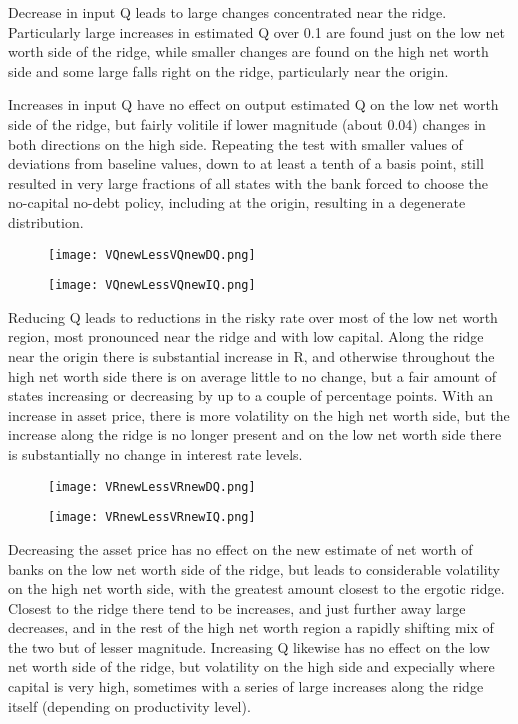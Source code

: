 \documentclass[english]{article}
\begin{document}
Decrease in input Q leads to large changes concentrated near the ridge. Particularly large
increases in estimated Q over 0.1 are found just on the low net worth side of the ridge, while smaller changes
are found on the high net worth side and some large falls right on the ridge, particularly near the origin.

Increases in input Q have no effect on output estimated Q on the low net worth side 
of the ridge, but fairly volitile if lower magnitude (about 0.04) changes in both directions 
on the high side. Repeating the test with smaller values of deviations from baseline values, 
down to at least a tenth of a basis point, still resulted in very large fractions of all states 
with the bank forced to choose the no-capital no-debt policy, including at the origin, resulting in 
a degenerate distribution.




\begin{figure}[H]
\centering
		\texttt{[image: VQnewLessVQnewDQ.png]}
\end{figure}
\begin{figure}[H]
\centering
		\texttt{[image: VQnewLessVQnewIQ.png]}
\end{figure}


Reducing Q leads to reductions in the risky rate over most of the low net worth region, most pronounced
near the ridge and with low capital. Along the ridge near the origin there is substantial increase in R, and 
otherwise throughout the high net worth side there is on average little to no change, but a fair amount of 
states increasing or decreasing by up to a couple of percentage points. With an increase in asset price, 
there is more volatility on the high net worth side, but the increase along the ridge is no longer present and 
on the low net worth side there is substantially no change in interest rate levels.



\begin{figure}[H]
\centering
		\texttt{[image: VRnewLessVRnewDQ.png]}
\end{figure}
\begin{figure}[H]
\centering
		\texttt{[image: VRnewLessVRnewIQ.png]}
\end{figure}

Decreasing the asset price has no effect on the new estimate of net worth of banks on the low net worth side of the ridge, 
but leads to considerable volatility on the high net worth side, with the greatest amount closest to the ergotic ridge. 
Closest to the ridge there tend to be increases, and just further away large decreases, and in the rest of the 
high net worth region a rapidly shifting mix of the two but of lesser magnitude. Increasing Q likewise has no effect 
on the low net worth side of the ridge, but volatility on the high side and expecially where capital is very high, sometimes 
with a series of large increases along the ridge itself (depending on productivity level).
\end{document}
